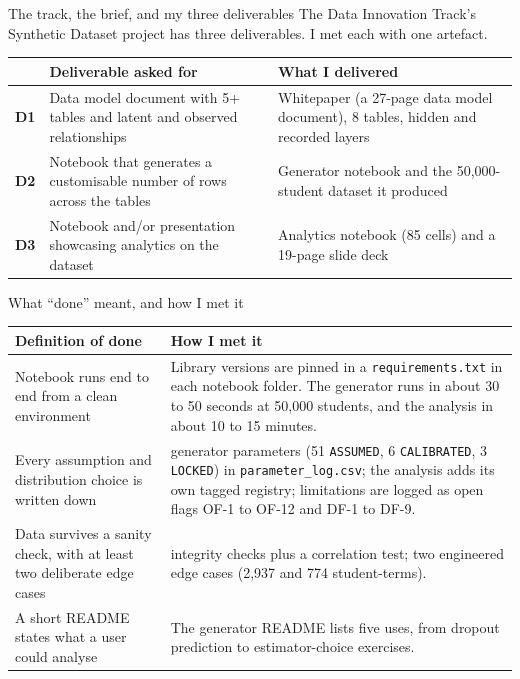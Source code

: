 \documentclass[aspectratio=169,11pt,t]{beamer}
\newcommand{\key}[1]{\textcolor{keyresult}{\textbf{#1}}}
\newcommand{\ptag}[1]{\texttt{\small #1}}
\begin{document}
\begin{frame}{The track, the brief, and my three deliverables}
  \small
  The Data Innovation Track's Synthetic Dataset project has three deliverables.
  I met each with one artefact.
  \medskip

  \centering\footnotesize
  \renewcommand{\arraystretch}{1.25}
  \begin{tabular}{@{}>{\raggedright\arraybackslash}p{0.8cm}>{\raggedright\arraybackslash}p{5.6cm}>{\raggedright\arraybackslash}p{7.1cm}@{}}
    \toprule
     & \textbf{Deliverable asked for} & \textbf{What I delivered}\\
    \midrule
    \key{D1} & Data model document with 5+ tables and latent and observed relationships & Whitepaper (a 27-page data model document), 8 tables, hidden and recorded layers\\
    \key{D2} & Notebook that generates a customisable number of rows across the tables & Generator notebook and the 50,000-student dataset it produced\\
    \key{D3} & Notebook and/or presentation showcasing analytics on the dataset & Analytics notebook (85 cells) and a 19-page slide deck\\
    \bottomrule
  \end{tabular}
\end{frame}

\begin{frame}{What ``done'' meant, and how I met it}
  \centering\scriptsize
  \renewcommand{\arraystretch}{1.2}
  \begin{tabular}{@{}>{\raggedright\arraybackslash}p{4.0cm}>{\raggedright\arraybackslash}p{9.0cm}@{}}
    \toprule
    \textbf{Definition of done} & \textbf{How I met it}\\
    \midrule
    Notebook runs end to end from a clean environment & Library versions are pinned in a \texttt{requirements.txt} in each notebook folder. The generator runs in about 30 to 50 seconds at 50,000 students, and the analysis in about 10 to 15 minutes.\\
    Every assumption and distribution choice is written down & 60 generator parameters (51 \ptag{ASSUMED}, 6 \ptag{CALIBRATED}, 3 \ptag{LOCKED}) in \texttt{parameter\_log.csv}; the analysis adds its own tagged registry; limitations are logged as open flags OF-1 to OF-12 and DF-1 to DF-9.\\
    Data survives a sanity check, with at least two deliberate edge cases & 29 integrity checks plus a correlation test; two engineered edge cases (2,937 and 774 student-terms).\\
    A short README states what a user could analyse & The generator README lists five uses, from dropout prediction to estimator-choice exercises.\\
    \bottomrule
  \end{tabular}
\end{frame}
\end{document}
